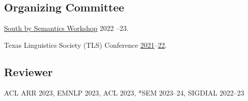 \subsection{Organizing Committee}

\quad \href{https://sites.utexas.edu/sxsemantics}{South by Semantics Workshop} 2022 --23.

\quad Texas Linguistics Society (TLS) Conference \href{http://tls.ling.utexas.edu/2021/}{2021}--\href{http://tls.ling.utexas.edu/2022/}{22}.

\subsection{Reviewer}

\quad ACL ARR 2023, EMNLP 2023, ACL 2023, *SEM 2023--24, SIGDIAL 2022--23
